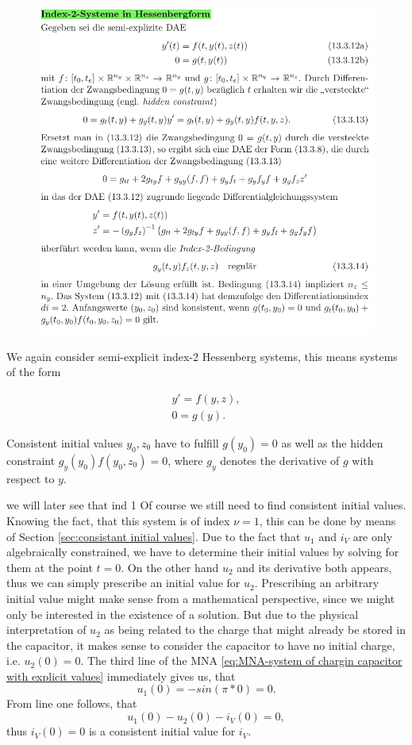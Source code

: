 \begin{figure}
	\centering
	\includegraphics[width=0.7\linewidth]{screenshot032}
	\caption{}
	\label{fig:screenshot032}
\end{figure}

We again consider semi-explicit index-2 Hessenberg systems, this means systems of the form

\begin{align*}
	y' = f(y,z), \\
	0 = g(y).
\end{align*}

Consistent initial values $y_0, z_0$ have to fulfill $g(y_0) = 0$ as well as the hidden constraint $g_y(y_0)f(y_0, z_0) = 0$, where $g_y$ denotes the derivative of $g$ with respect to $y$.
	
\begin{example1}
	we will later see that ind 1
		Of course we still need to find consistent initial values. Knowing the fact, that this system is of index $\nu=1$, this can be done by means of Section \ref{sec:consistant initial values}. Due to the fact that $u_1$ and $i_V$ are only algebraically constrained, we have to determine their initial values by solving for them at the point $t=0$. On the other hand $u_2$ and its derivative both appears, thus we can simply prescribe an initial value for $u_2$. Prescribing an arbitrary initial value might make sense from a mathematical perspective, since we might only be interested in the existence of a solution. But due to the physical interpretation of $u_2$ as being related to the charge that might already be stored in the capacitor, it makes sense to consider the capacitor to have no initial charge, i.e. $u_2(0) = 0$.
	The third line of the MNA \eqref{eq:MNA-system of chargin capacitor with explicit values} immediately gives us, that
	\begin{displaymath}
		u_1(0) = -sin(\pi * 0) = 0.
	\end{displaymath}
	From line one follows, that
	\begin{displaymath}
		u_1(0) - u_2(0) - i_V(0) = 0,
	\end{displaymath}
	thus $i_V(0) = 0$ is a consistent initial value for $i_V$.
\end{example1}

